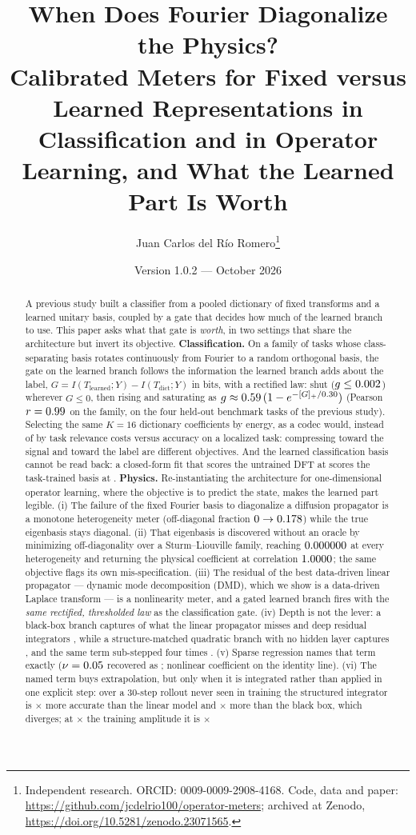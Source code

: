 \documentclass[11pt,a4paper]{article}
\title{\textbf{When Does Fourier Diagonalize the Physics?}\\[3pt]
\large Calibrated Meters for Fixed versus Learned Representations in Classification and in Operator Learning, and What the Learned Part Is Worth}
\author{Juan Carlos del Río Romero\thanks{Independent research. ORCID: 0009-0009-2908-4168. Code, data and paper: \url{https://github.com/jcdelrio100/operator-meters}; archived at Zenodo, \url{https://doi.org/10.5281/zenodo.23071565}.}}
\date{Version 1.0.2 — October 2026}
\begin{document}
\maketitle

\begin{abstract}
\noindent A previous study built a classifier from a pooled dictionary of fixed transforms and a learned unitary basis, coupled by a gate that decides how much of the learned branch to use. This paper asks what that gate is \emph{worth}, in two settings that share the architecture but invert its objective. \textbf{Classification.} On a family of tasks whose class-separating basis rotates continuously from Fourier to a random orthogonal basis, the gate on the learned branch follows the information the learned branch adds about the label, $G = I(T_{\mathrm{learned}};Y) - I(T_{\mathrm{dict}};Y)$ in bits, with a rectified law: shut ($g \le 0.002$) wherever $G \le 0$, then rising and saturating as $g \approx 0.59\,(1 - e^{-[G]_+/0.30})$ (Pearson $r = 0.99$ on the family, \gapRsatHeld{} on the four held-out benchmark tasks of the previous study). Selecting the same $K=16$ dictionary coefficients by energy, as a codec would, instead of by task relevance costs \rrLocEnergy{} versus \rrLocTask{} accuracy on a localized task: compressing toward the signal and toward the label are different objectives. And the learned classification basis cannot be read back: a closed-form fit that scores the untrained DFT at \symDftFit{} scores the task-trained basis at \symCeFit{}. \textbf{Physics.} Re-instantiating the architecture for one-dimensional operator learning, where the objective is to predict the state, makes the learned part legible. (i) The failure of the fixed Fourier basis to diagonalize a diffusion propagator is a monotone heterogeneity meter (off-diagonal fraction $0 \to 0.178$) while the true eigenbasis stays diagonal. (ii) That eigenbasis is discovered without an oracle by minimizing off-diagonality over a Sturm–Liouville family, reaching $0.000000$ at every heterogeneity and returning the physical coefficient at correlation $1.0000$; the same objective flags its own mis-specification. (iii) The residual of the best data-driven linear propagator — dynamic mode decomposition (DMD), which we show is a data-driven Laplace transform — is a nonlinearity meter, and a gated learned branch fires with the \emph{same rectified, thresholded law} as the classification gate. (iv) Depth is not the lever: a black-box branch captures \wpDepthMlp{} of what the linear propagator misses and deep residual integrators \wpDepthResFour{}, while a structure-matched quadratic branch with no hidden layer captures \wpDepthQuad{}, and the same term sub-stepped four times \wpDepthQuadInt{}. (v) Sparse regression names that term exactly ($\nu = 0.05$ recovered as \wpSindyNuHat; nonlinear coefficient on the identity line). (vi) The named term buys extrapolation, but only when it is integrated rather than applied in one explicit step: over a 30-step rollout never seen in training the structured integrator is \wpRollGainId$\times$ more accurate than the linear model and \wpRollGainMlpId$\times$ more than the black box, which diverges; at \wpAmpOod$\times$ the training amplitude it is \wpRollGainOod$\times$ 
\end{abstract}
\end{document}
